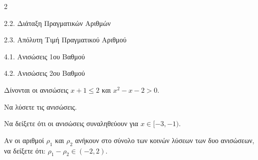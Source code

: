 \begin{ylh}{2}
    \item 2.2. Διάταξη Πραγματικών Αριθμών
    \item 2.3. Απόλυτη Τιμή Πραγματικού Αριθμού
    \item 4.1. Ανισώσεις 1ου Βαθμού
    \item 4.2. Ανισώσεις 2ου Βαθμού
\end{ylh}
Δίνονται οι ανισώσεις $x + 1 \le 2$ και $x^2 - x - 2 > 0$.

\begin{alist}
\item Να λύσετε τις ανισώσεις.
\item Να δείξετε ότι οι ανισώσεις συναληθεύουν για $x \in [-3, -1)$.
\item Αν οι αριθμοί $\rho_1$ και $\rho_2$ ανήκουν στο σύνολο των κοινών λύσεων των δυο ανισώσεων, να δείξετε ότι: $\rho_1 - \rho_2 \in (-2, 2)$.
\end{alist}

